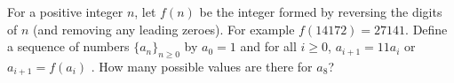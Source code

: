 For a positive integer $n$, let $f(n)$ be the integer formed by reversing the digits of $n$ (and removing any leading zeroes). For example $f(14172)=27141$. Define a sequence of numbers $\{a_n\}_{n\ge 0}$ by $a_0=1$ and for all $i\ge 0$, $a_{i+1}=11a_i$ or $a_{i+1}=f(a_i)$ . How many possible values are there for $a_8$?
